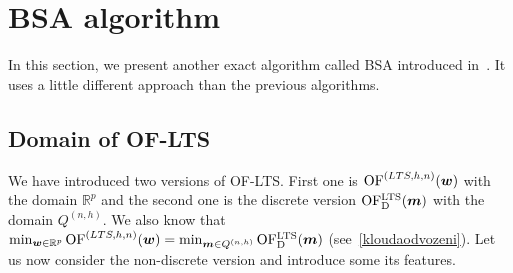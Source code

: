 











\section{BSA algorithm} \label{bsasection}
In this section, we present another exact algorithm called BSA introduced in~\cite{klouda2015exact}. It uses a little different approach than the previous algorithms.



\subsection{Domain of OF-LTS}
We have introduced two versions of OF-LTS. First one is 
$\operatorname{OF}^{(LTS,h, n)}(\boldsymbol{w})$ with the domain $\mathbb{R}^p$ and the second one is the discrete version 
$\operatorname{OF^{LTS}_D}(\boldsymbol{m})$ with the domain $Q^{(n,h)}$. 
We also know that 
$\operatorname*{min}_{\boldsymbol{w} \in \mathbb{R}^p} \operatorname{OF}^{(LTS,h, n)}(\boldsymbol{w})  =  \operatorname*{min}_{\boldsymbol{m} \in Q^{(n,h)}} \operatorname{OF^{LTS}_D}(\boldsymbol{m})$ (see~\eqref{kloudaodvozeni}). Let us now consider the non-discrete version and introduce some its features.

